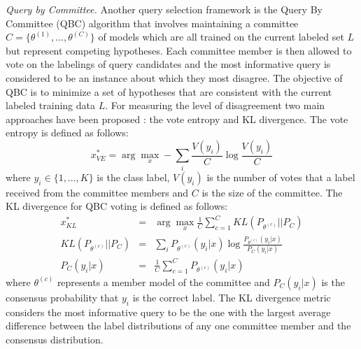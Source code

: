 \textit{Query by Committee.} Another query selection framework is the Query By Committee (QBC) algorithm that involves maintaining a committee $C = \{\theta^{(1)},...,\theta^{(C)}\}$ of models which are all trained on the current labeled set $L$ but represent competing hypotheses. Each committee member is then allowed to vote on the labelings of query candidates and the most informative query is considered to be an instance about which they most disagree. The objective of QBC is to minimize a set of hypotheses that are consistent with the current labeled training data $L$. For measuring the level of disagreement two main approaches have been proposed \cite{Settles2009}: the vote entropy and KL divergence. The vote entropy is defined as follows:
\begin{equation}
    x_{VE}^{\ast} = \arg \max_x - \sum_i \frac{V(y_i)}{C} \log \frac{V(y_i)}{C}
\end{equation}
where $y_i \in \{1,...,K\}$ is the class label, $V(y_i)$ is the number of votes that a label received from the committee members and $C$ is the size of the committee. The KL divergence for QBC voting is defined as follows:
\begin{eqnarray}
    x_{KL}^{\ast} &=& \arg \max_x \frac{1}{C} \sum_{c=1}^{C} KL(P_{\theta^{(c)}}||P_C)\\
    KL(P_{\theta^{(c)}}||P_C) &=& \sum_i P_{\theta^{(c)}}(y_i|x) \log \frac{P_{\theta^{(c)}}(y_i|x)}{P_C(y_i|x)}\\
    P_C(y_i|x) &=& \frac{1}{C}\sum_{c=1}^{C}P_{\theta^{(c)}}(y_i|x)
\end{eqnarray}
where $\theta^{(c)}$ represents a member model of the committee and $P_C(y_i|x)$ is the consensus probability that $y_i$ is the correct label. The KL divergence metric considers the most informative query to be the one with the largest average difference between the label distributions of any one committee member and the consensus distribution.\\

